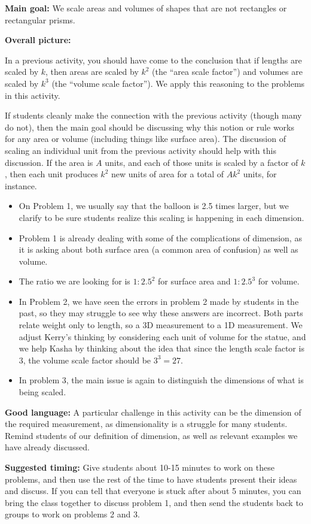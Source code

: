 \documentclass[nooutcomes, noauthor, handout]{ximera}
\begin{document}
\begin{instructorNotes}

{\bf Main goal:} We scale areas and volumes of shapes that are not rectangles or rectangular prisms.


{\bf Overall picture:} 

In a previous activity, you should have come to the conclusion that if lengths are scaled by $k$, then areas are scaled by $k^2$ (the ``area scale factor'') and volumes are scaled by $k^3$ (the ``volume scale factor'').  We apply this reasoning to the problems in this activity.

If students cleanly make the connection with the previous activity (though many do not), then the main goal should be discussing why this notion or rule works for any area or volume  (including things like surface area).  The discussion of scaling an individual unit from the previous activity should help with this discussion.  If the area is $A$ units, and each of those units is scaled by a factor of $k$, then each unit produces $k^2$ new units of area for a total of $Ak^2$ units, for instance.


\begin{itemize}
	\item On Problem 1, we usually say that the balloon is 2.5 times larger, but we clarify to be sure students realize this scaling is happening in each dimension. 
	\item Problem 1 is already dealing with some of the complications of dimension, as it is asking about both surface area (a common area of confusion) as well as volume.
	\item The ratio we are looking for is $1:2.5^2$ for surface area and $1:2.5^3$ for volume.
	\item In Problem 2, we have seen the errors in problem 2 made by students in the past, so they may struggle to see why these answers are incorrect. Both parts relate weight only to length, so a 3D measurement to a 1D measurement. We adjust Kerry's thinking by considering each unit of volume for the statue, and we help Kasha by thinking about the idea that since the length scale factor is $3$, the volume scale factor should be $3^3=27$.
	\item In problem 3, the main issue is again to distinguish the dimensions of what is being scaled.
\end{itemize}

{\bf Good language:} A particular challenge in this activity can be the dimension of the required measurement, as dimensionality is a struggle for many students. Remind students of our definition of dimension, as well as relevant examples we have already discussed.


{\bf Suggested timing:} Give students about 10-15 minutes to work on these problems, and then use the rest of the time to have students present their ideas and discuss.  If you can tell that everyone is stuck after about 5 minutes, you can bring the class together to discuss problem 1, and then send the students back to groups to work on problems 2 and 3.
\end{instructorNotes}
\end{document}
